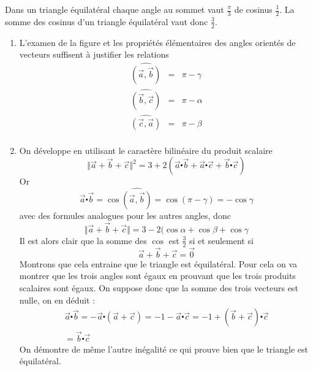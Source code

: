 Dans un triangle équilatéral chaque angle au sommet vaut $\frac{\pi}{3}$ de cosinus $\frac{1}{2}$. La somme des cosinus d'un triangle équilatéral vaut donc $\frac{3}{2}$.
\begin{enumerate}
\item L'examen de la figure et les propriétés élémentaires des angles orientés de vecteurs suffisent à justifier les relations
\begin{eqnarray*}
\widehat{(\overrightarrow{a},\overrightarrow{b})}&=&\pi - \gamma \\
\widehat{(\overrightarrow{b},\overrightarrow{c})}&=&\pi - \alpha \\
\widehat{(\overrightarrow{c},\overrightarrow{a})}&=&\pi - \beta \\
\end{eqnarray*}
\item On développe en utilisant le caractère bilinéaire du produit scalaire 
\[\Vert\overrightarrow{a}+\overrightarrow{b}+\overrightarrow{c}\Vert^2 = 3 + 2( \overrightarrow{a}\centerdot \overrightarrow{b} + \overrightarrow{a}\centerdot \overrightarrow{c} + \overrightarrow{b}\centerdot \overrightarrow{c})\]
Or 
\[\overrightarrow{a}\centerdot \overrightarrow{b} = \cos \widehat{(\overrightarrow{a},\overrightarrow{b})} = \cos (\pi - \gamma)= -\cos \gamma\]
avec des formules analogues pour les autres angles, donc 
\[\Vert\overrightarrow{a}+\overrightarrow{b}+\overrightarrow{c}\Vert = 3 - 2( \cos \alpha +\cos \beta +\cos \gamma\]
Il est alors clair que la somme des $\cos$ est $\frac{3}{2}$ si et seulement si
\[\overrightarrow{a}+\overrightarrow{b}+\overrightarrow{c}=\overrightarrow{0}\]
Montrons que cela entraine que le triangle est équilatéral. Pour cela on va montrer que les trois angles sont égaux en prouvant que les trois produits scalaires sont égaux.\newline
On suppose donc que la somme des trois vecteurs est nulle, on en déduit :
\begin{eqnarray*}
\overrightarrow{a}\centerdot \overrightarrow{b} = -\overrightarrow{a}\centerdot (\overrightarrow{a}+\overrightarrow{c})=
-1-\overrightarrow{a}\centerdot \overrightarrow{c}=
-1+(\overrightarrow{b}+\overrightarrow{c})\centerdot \overrightarrow{c}\\
= \overrightarrow{b}\centerdot \overrightarrow{c}
\end{eqnarray*} 
On démontre de même l'autre inégalité ce qui prouve bien que le triangle est équilatéral.
\end{enumerate}
